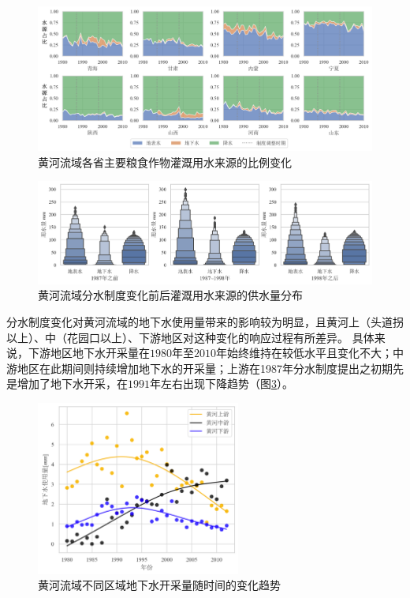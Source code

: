 \begin{figure}[!ht]
    \centering
    \includegraphics[width=\textwidth]{img/ch6/ch6_green_blue_water.png}
    \caption{黄河流域各省主要粮食作物灌溉用水来源的比例变化}\label{ch6:fig:sources}
\end{figure}

\begin{figure}[!ht]
    \centering
    \includegraphics[width=\textwidth]{img/ch6/ch6_sources_change.png}
    \caption{黄河流域分水制度变化前后灌溉用水来源的供水量分布}\label{ch6:fig:sources_change}
\end{figure}

分水制度变化对黄河流域的地下水使用量带来的影响较为明显，且黄河上（头道拐以上）、中（花园口以上）、下游地区对这种变化的响应过程有所差异。
具体来说，下游地区地下水开采量在$1980$年至$2010$年始终维持在较低水平且变化不大；中游地区在此期间则持续增加地下水的开采量；上游在1987年分水制度提出之初期先是增加了地下水开采，在$1991$年左右出现下降趋势（图\ref{ch6:fig:groundwater}）。

\begin{figure}[!ht]
    \centering
    \includegraphics[width=0.6\textwidth]{img/ch6/ch6_groundwater.png}
    \caption{黄河流域不同区域地下水开采量随时间的变化趋势}\label{ch6:fig:groundwater}
\end{figure}